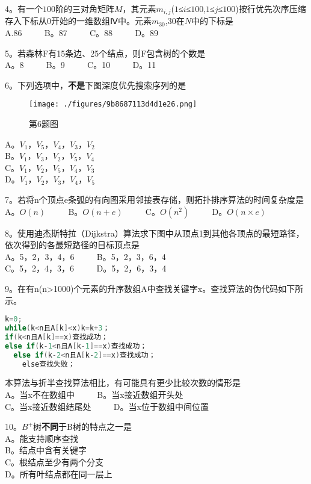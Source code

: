 4。有一个$100$阶的三对角矩阵$M$，其元素$m_{i,j}$($1$≤$i$≤$100$,$1$≤$j$≤$100$)按行优先次序压缩存入下标从$0$开始的一维数组Ⅳ中。元素$m_{30}$,$30$在$N$中的下标是 \\
A.86 $\qquad$ B。87 $\qquad$ C。88 $\qquad$ D。89

5。若森林F有15条边、25个结点，则F包含树的个数是 \\
A。8 $\qquad$ B。9 $\qquad$ C。10 $\qquad$ D。11

6。下列选项中，\textbf{不是}下图深度优先搜索序列的是 \\
\begin{figure}[ht]
\centering
\texttt{[image: ./figures/9b8687113d4d1e26.png]}
\caption{第6题图} \label{fig_CSN16_2}
\end{figure}
A。$V_1$，$V_5$，$V_4$，$V_3$，$V_2$ \\
B。$V_1$，$V_3$，$V_2$，$V_5$，$V_4$ \\
C。$V_1$，$V_2$，$V_5$，$V_4$，$V_3$ \\
D。$V_1$，$V_2$，$V_3$，$V_4$，$V_5$

7。若将n个顶点e条弧的有向图采用邻接表存储，则拓扑排序算法的时间复杂度是 \\
A。$O(n)$ $\qquad$ B。$O(n+e)$ $\qquad$ C。$O(n^2)$ $\qquad$ D。$O(n\times e)$

8。使用迪杰斯特拉（Dijkstra）算法求下图中从顶点1到其他各顶点的最短路径，依次得到的各最短路径的目标顶点是 \\
A。5，2，3，4，6 $\qquad$ B。5，2，3，6，4 \\
C。5，2，4，3，6 $\qquad$ D。5，2，6，3，4

9。在有n(n>1000)个元素的升序数组A中查找关键字x。查找算法的伪代码如下所示。 \\
\begin{lstlisting}[language=cpp]
k=0;
while(k<n且A[k]<x)k=k+3；
if(k<n且A[k]==x)查找成功；
else if(k-1<n且A[k-1]==x)查找成功；
  else if(k-2<n且A[k-2]==x)查找成功；
    else查找失败；
\end{lstlisting}
本算法与折半查找算法相比，有可能具有更少比较次数的情形是 \\
A。当x不在数组中 $\qquad$ B。当x接近数组开头处 \\
C。当x接近数组结尾处 $\qquad$ D。当x位于数组中间位置

10。$B^+$树\textbf{不同}于B树的特点之一是 \\
A。能支持顺序查找 \\
B。结点中含有关键字 \\
C。根结点至少有两个分支 \\
D。所有叶结点都在同一层上

